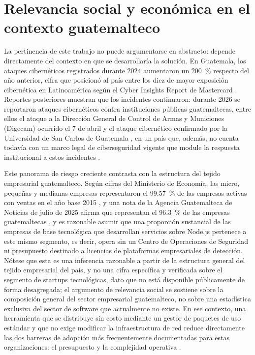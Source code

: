 \section{Relevancia social y económica en el contexto guatemalteco}
\label{sec:just-contexto}
La pertinencia de este trabajo no puede argumentarse en abstracto: depende directamente del
contexto en que se desarrollaría la solución. En Guatemala, los ataques cibernéticos registrados
durante 2024 aumentaron un 200~\% respecto del año anterior, cifra que posicionó al país entre los
diez de mayor exposición cibernética en Latinoamérica según el Cyber Insights Report de
Mastercard \cite{mastercard2025}. Reportes posteriores muestran que los incidentes continuaron: durante 2026 se reportaron ataques
cibernéticos contra instituciones públicas guatemaltecas, entre ellos el ataque a la Dirección
General de Control de Armas y Municiones (Digecam) ocurrido el 7 de abril \cite{emisoras2026digecam}
y el ataque cibernético confirmado por la Universidad de San Carlos de Guatemala
\cite{emisoras2026usac}, en un país que, además, no cuenta todavía con un marco legal de
ciberseguridad vigente que module la respuesta institucional a estos incidentes
\cite{lahora2026estancada}.

Este panorama de riesgo creciente contrasta con la estructura del tejido empresarial
guatemalteco. Según cifras del Ministerio de Economía, las micro, pequeñas y medianas empresas
representaron el 99.57~\% de las empresas activas con ventas en el año base 2015
\cite{mineco2015mipyme}, y una nota de la Agencia Guatemalteca de Noticias de julio de 2025 afirma
que representan el 96.3~\% de las empresas guatemaltecas \cite{agn2025mipymes}, y
es razonable asumir que una proporción sustancial de las empresas de base tecnológica que
desarrollan servicios sobre Node.js pertenece a este mismo segmento, es decir, opera sin un
Centro de Operaciones de Seguridad ni presupuesto destinado a licencias de plataformas
empresariales de detección. Nótese que esta es una inferencia razonable a partir de la estructura
general del tejido empresarial del país, y no una cifra específica y verificada sobre el segmento de
startups tecnológicas, dato que no está disponible públicamente de forma desagregada; el
argumento de relevancia social se sostiene sobre la composición general del sector empresarial
guatemalteco, no sobre una estadística exclusiva del sector de software que actualmente no existe.
En ese contexto, una herramienta que se distribuye sin costo mediante un gestor de paquetes de
uso estándar y que no exige modificar la infraestructura de red reduce directamente las dos
barreras de adopción más frecuentemente documentadas para estas organizaciones: el presupuesto y la complejidad operativa \cite{enisa2021smes}.

